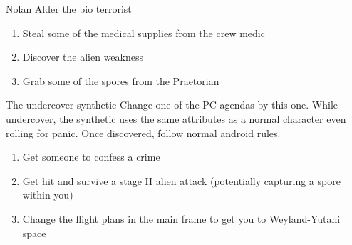 \begin{rpg-commentbox}{Nolan Alder the  bio terrorist}
    \begin{enumerate}[label=\textbf{Act \arabic*}, leftmargin=1cm]
        \item Steal some of the medical supplies from the crew medic
        \item Discover the alien weakness
        \item Grab some of the spores from the Praetorian
    \end{enumerate}
\end{rpg-commentbox}

 
\begin{rpg-commentbox}{The undercover synthetic}
    Change one of the PC agendas by this one. While undercover, the synthetic uses the same attributes as a normal character even rolling for panic. Once discovered, follow normal android rules. 

    \begin{enumerate}[label=\textbf{Act \arabic*}, leftmargin=1cm]
        \item Get someone to confess a crime
        \item Get hit and survive a stage II alien attack (potentially capturing a spore within you)
        \item Change the flight plans in the main frame to get you to Weyland-Yutani space
    \end{enumerate}
\end{rpg-commentbox}

